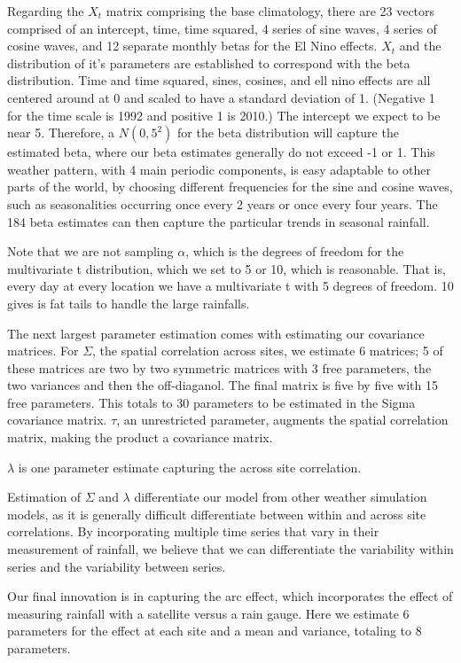 \documentclass[12pt]{article}
\begin{document}
Regarding the $X_t$ matrix comprising the base climatology, there are 23 vectors comprised of an intercept, time, time squared, 4 series of sine waves, 4 series of cosine waves, and 12 separate monthly betas for the El Nino effects. $X_t$ and the distribution of it's parameters are established to correspond with the beta distribution. Time and time squared, sines, cosines, and ell nino effects are all centered around at 0 and scaled to have a standard deviation of 1. (Negative 1 for the time scale is 1992 and positive 1 is 2010.) The  intercept we expect to be near 5. Therefore, a $N(0,5^2)$ for the beta distribution will capture the estimated beta, where our beta estimates generally do not exceed -1 or 1. This weather pattern, with 4 main periodic components, is easy adaptable to other parts of the world, by choosing different frequencies for the sine and cosine waves, such as seasonalities occurring once every 2 years or once every four years. The 184 beta estimates can then capture the particular trends in seasonal rainfall. 

Note that we are not sampling $\alpha$, which is the degrees of freedom for the multivariate t distribution, which we set to 5 or 10, which is reasonable. That is, every day at every location we have a multivariate t with 5 degrees of freedom. 10 gives is fat tails to handle the large rainfalls. 

The next largest parameter estimation comes with estimating our covariance matrices. For $\Sigma$, the spatial correlation across sites, we estimate 6 matrices;  5 of these matrices are two by two symmetric matrices with 3 free parameters, the two variances and then the off-diaganol. The final matrix is five by five with 15 free parameters. This totals to 30 parameters to be estimated in the Sigma covariance matrix. $\tau$, an unrestricted parameter, augments the spatial correlation matrix, making the product a covariance matrix. 

$\lambda$ is one parameter estimate capturing the across site correlation. 

Estimation of $\Sigma$ and $\lambda$ differentiate our model from other weather simulation models, as it is generally difficult differentiate between within and across site correlations. By incorporating multiple time series that vary in their measurement of rainfall, we believe that we can differentiate the variability within series and the variability between series. 

Our final innovation is in capturing the arc effect, which incorporates the effect of measuring rainfall with a satellite versus a rain gauge. Here we estimate 6 parameters for the effect at each site and a mean and variance, totaling to 8 parameters. 
\end{document}
